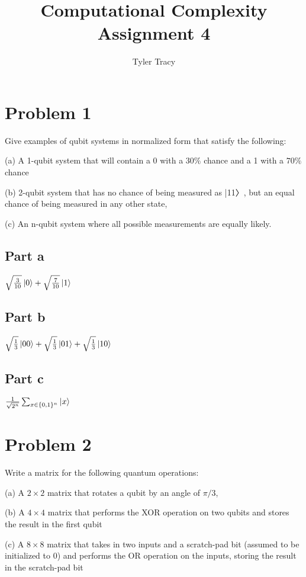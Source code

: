 \documentclass[12pt]{article}
\title{Computational Complexity Assignment 4}
\author{Tyler Tracy}
\begin{document}
\maketitle

\section*{Problem 1}

\begin{questionbox}
	Give examples of qubit systems in normalized form that satisfy the following:

	(a) A 1-qubit system that will contain a 0 with a $30\%$ chance and a 1 with a $70\%$ chance

	(b) 2-qubit system that has no chance of being measured as |11〉, but an equal chance of being measured in any other state,

	(c) An n-qubit system where all possible measurements are equally likely.
\end{questionbox}


\subsection*{Part a}
$\sqrt{\frac{3}{10}}\ket{0} + \sqrt{\frac{7}{10}} \ket{1}$
\subsection*{Part b}
$\sqrt{\frac{1}{3}}\ket{00} + \sqrt{\frac{1}{3}} \ket{01} + \sqrt{\frac{1}{3}} \ket{10}$


\subsection*{Part c}
$\frac{1}{\sqrt{2^n}}\sum_{x \in \{0,1\}^n} \ket{x}$

\section*{Problem 2}

\begin{questionbox}
	Write a matrix for the following quantum operations:

(a) A $2 \times 2$ matrix that rotates a qubit by an angle of $\pi/3$,

(b) A $4 \times 4$ matrix that performs the XOR operation on two qubits and
stores the result in the first qubit

(c) A $8 \times 8$ matrix that takes in two inputs and a scratch-pad bit (assumed
to be initialized to 0) and performs the OR operation on the inputs,
storing the result in the scratch-pad bit
\end{questionbox}
\end{document}
